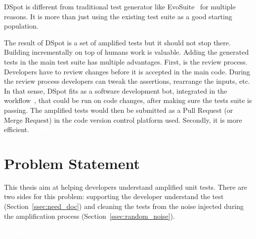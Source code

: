 \documentclass[11pt]{sdm_internship}
\newcommand{\todo}[1]{\colorbox{Red!75}{\textcolor{white}{\textbf{TODO\ifx&#1&\else: #1\fi}}}}
\newcommand{\dspot}{DSpot\xspace}
\theoremstyle{definition}
\begin{document}
\dspot{} is different from traditional test generator like EvoSuite~\cite{fraser2011evosuite} for multiple reasons.
It is more than just using the existing test suite as a good starting population.
\todo{}
\cite{rojas2017detailed}

The result of \dspot{} is a set of amplified tests but it should not stop there.
Building incrementally on top of humans work is valuable.
Adding the generated tests in the main test suite has multiple advantages.
First, is the review process.
Developers have to review changes before it is accepted in the main code.
During the review process developers can tweak the assertions, rearrange the inputs, etc.
In that sense, \dspot{} fits as a software development bot, integrated in the workflow~\cite{urli2018design}, that could be run on code changes, after making sure the tests suite is passing.
The amplified tests would then be submitted as a Pull Request (or Merge Request) in the code version control platform used.
Secondly, it is more efficient.\todo{}


\section{Problem Statement}%
\label{sec:problem_statement}
This thesis aim at helping developers understand amplified unit tests.
There are two sides for this problem: supporting the developer understand the test (Section~\ref{ssec:need_doc}) and cleaning the tests from the noise injected during the amplification process (Section~\ref{ssec:random_noise}).

\todo{\cite{marculescu2017transferring}}

\end{document}
